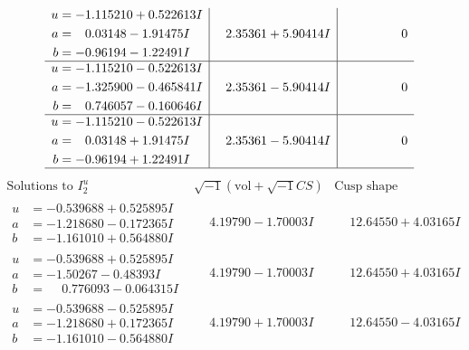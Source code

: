 \documentclass[1p]{elsarticle_modified}
\theoremstyle{definition}
\newcommand{\I}{\sqrt{-1}}
\begin{document}
$$\begin{array}{c|c|c}
\begin{aligned}
u &= -1.115210 + 0.522613 I \\
a &= \phantom{-}0.03148 - 1.91475 I \\
b &= -0.96194 - 1.22491 I\end{aligned}
 & \phantom{-}2.35361 + 5.90414 I & \phantom{-0.000000 } 0 \\ \hline\begin{aligned}
u &= -1.115210 - 0.522613 I \\
a &= -1.325900 - 0.465841 I \\
b &= \phantom{-}0.746057 - 0.160646 I\end{aligned}
 & \phantom{-}2.35361 - 5.90414 I & \phantom{-0.000000 } 0 \\ \hline\begin{aligned}
u &= -1.115210 - 0.522613 I \\
a &= \phantom{-}0.03148 + 1.91475 I \\
b &= -0.96194 + 1.22491 I\end{aligned}
 & \phantom{-}2.35361 - 5.90414 I & \phantom{-0.000000 } 0\\
 \hline 
 \end{array}$$\newpage$$\begin{array}{c|c|c}  
\text{Solutions to }I^u_{2}& \I (\text{vol} + \sqrt{-1}CS) & \text{Cusp shape}\\
 \hline 
\begin{aligned}
u &= -0.539688 + 0.525895 I \\
a &= -1.218680 - 0.172365 I \\
b &= -1.161010 + 0.564880 I\end{aligned}
 & \phantom{-}4.19790 - 1.70003 I & \phantom{-}12.64550 + 4.03165 I \\ \hline\begin{aligned}
u &= -0.539688 + 0.525895 I \\
a &= -1.50267 - 0.48393 I \\
b &= \phantom{-}0.776093 - 0.064315 I\end{aligned}
 & \phantom{-}4.19790 - 1.70003 I & \phantom{-}12.64550 + 4.03165 I \\ \hline\begin{aligned}
u &= -0.539688 - 0.525895 I \\
a &= -1.218680 + 0.172365 I \\
b &= -1.161010 - 0.564880 I\end{aligned}
 & \phantom{-}4.19790 + 1.70003 I & \phantom{-}12.64550 - 4.03165 I \\ \hline\begin{aligned}

\end{aligned}
\end{array}$$
\end{document}
